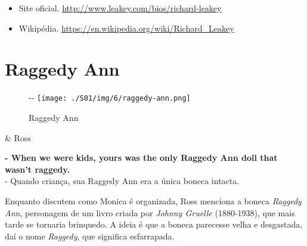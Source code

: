 \begin{itemize}
\tightlist
\item
  \sloppy Site oficial. \url{http://www.leakey.com/bios/richard-leakey}
\item
  \sloppy Wikipédia. \url{https://en.wikipedia.org/wiki/Richard_Leakey}
\end{itemize}

\hypertarget{raggedy-ann}{%
\section{Raggedy Ann}\label{raggedy-ann}}

\begin{figure}[!ht]
  \begin{adjustwidth}{-\oddsidemargin-1in}{-\rightmargin}
    \centering
    \texttt{[image: ./S01/img/6/raggedy-ann.png]}
    \caption{Raggedy Ann\label{fig:raggedy-ann}}
  \end{adjustwidth}
\end{figure}

\begin{tcolorbox}[enhanced,center upper,
    drop fuzzy shadow southeast, boxrule=0.3pt,
    lower separated=false,
    colframe=black!30!dialogoBorder,colback=white]
\begin{minipage}[c]{0.14\linewidth}
   & \centering \scriptsize{Ross}
\end{minipage}
\hspace{.1mm}
\begin{minipage}[c]{0.8\linewidth}
  \textbf{- When we were kids, yours was the only Raggedy Ann doll that wasn't raggedy.}\\
  - Quando criança, sua Raggedy Ann era a única boneca intacta.
\end{minipage}
\end{tcolorbox}

Enquanto discutem como Monica é organizada, Ross menciona a boneca
\emph{Raggedy Ann}, personagem de um livro criada por \emph{Johnny
Gruelle} (1880-1938), que mais tarde se tornaria brinquedo. A ideia é
que a boneca parecesse velha e desgastada, daí o nome \emph{Raggedy},
que significa esfarrapada.

